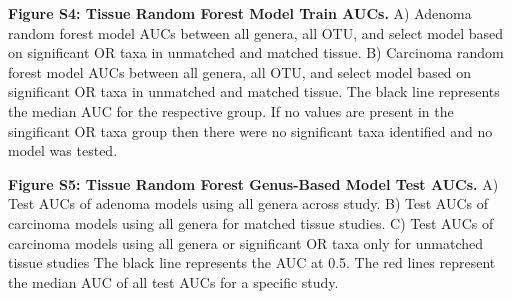 \documentclass[12pt,]{article}
\begin{document}
\textbf{Figure S4: Tissue Random Forest Model Train AUCs.} A) Adenoma
random forest model AUCs between all genera, all OTU, and select model
based on significant OR taxa in unmatched and matched tissue. B)
Carcinoma random forest model AUCs between all genera, all OTU, and
select model based on significant OR taxa in unmatched and matched
tissue. The black line represents the median AUC for the respective
group. If no values are present in the singificant OR taxa group then
there were no significant taxa identified and no model was tested.

\textbf{Figure S5: Tissue Random Forest Genus-Based Model Test AUCs.} A)
Test AUCs of adenoma models using all genera across study. B) Test AUCs
of carcinoma models using all genera for matched tissue studies. C) Test
AUCs of carcinoma models using all genera or significant OR taxa only
for unmatched tissue studies The black line represents the AUC at 0.5.
The red lines represent the median AUC of all test AUCs for a specific
study.

\newpage
\end{document}

